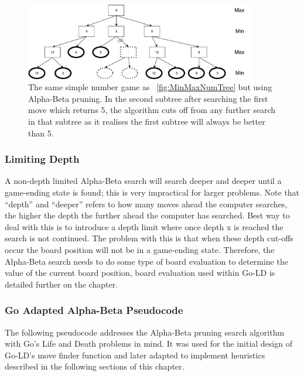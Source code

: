 \documentclass{l4proj}
\begin{document}
\begin{figure}[!ht]
\centering
\includegraphics[width=0.9\textwidth]{ABNumTree.pdf}

\caption{The same simple number game as ~\autoref{fig:MinMaxNumTree} but using Alpha-Beta pruning. In the second subtree after searching the first move which returns 5, the algorithm cuts off from any further search in that subtree as it realises the first subtree will always be better than 5. }
\label{fig:ABNumTree}
\end{figure}


\subsubsection{Limiting Depth}
A non-depth limited Alpha-Beta search will search deeper and deeper until a game-ending state is found; this is very impractical for larger problems. Note that “depth” and “deeper” refers to how many moves ahead the computer searches, the higher the depth the further ahead the computer has searched. Best way to deal with this is to introduce a depth limit where once depth x is reached the search is not continued. The problem with this is that when these depth cut-offs occur the board position will not be in a game-ending state. Therefore, the Alpha-Beta search needs to do some type of board evaluation to determine the value of the current board position, board evaluation used within Go-LD is detailed further on the chapter.

\subsubsection{Go Adapted Alpha-Beta Pseudocode}
The following pseudocode addresses the Alpha-Beta pruning search algorithm with Go's Life and Death problems in mind. It was used for the initial design of Go-LD's move finder function and later adapted to implement heuristics described in the following sections of this chapter.
\end{document}
